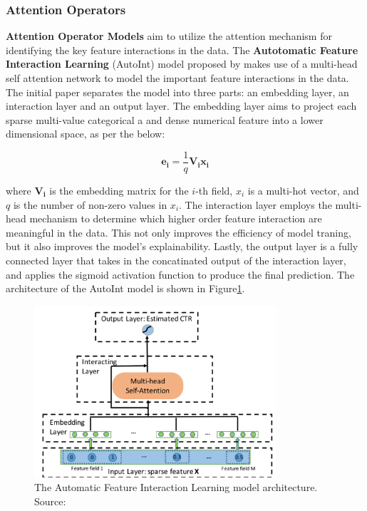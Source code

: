 \documentclass{mldsmsc}
\begin{document}
\subsubsection{Attention Operators}

\textbf{Attention Operator Models} aim to utilize the attention mechanism for identifying
the key feature interactions in the data. The \textbf{Autotomatic Feature Interaction Learning} (AutoInt) 
model proposed by \cite{RefWorks:song2019autoint} makes use of a multi-head self attention
network to model the important feature interactions in the data. The initial 
paper separates the model into three parts: an embedding layer, an interaction layer 
and an output layer. The embedding layer aims to project each sparse multi-value
categorical a and dense numerical feature into a lower dimensional space, as per the below:

$$
\mathbf{e_i} = \frac{1}{q} \mathbf{V_i x_i}
$$

where $\mathbf{V_i}$ is the embedding matrix for the $i$-th field, $x_i$ is a multi-hot vector, and $q$ 
is the number of non-zero values in $x_i$. The interaction layer employs the multi-head
mechanism to determine which higher order feature interaction are meaningful in the data. This not only
improves the efficiency of model traning, but it also improves the model's explainability. Lastly,
the output layer is a fully connected layer that takes in the concatinated output 
of the interaction layer, and applies the sigmoid activation function to produce the final prediction.
The architecture of the AutoInt model is shown in Figure\ref{fig:autoint}.

\begin{figure}[h]
    \centering
    \includegraphics[width=0.8\textwidth]{../figures/autoint.png}
    \caption{The Automatic Feature Interaction Learning model architecture. Source: \citep{RefWorks:song2019autoint}}
    \label{fig:autoint}
\end{figure}
\end{document}
